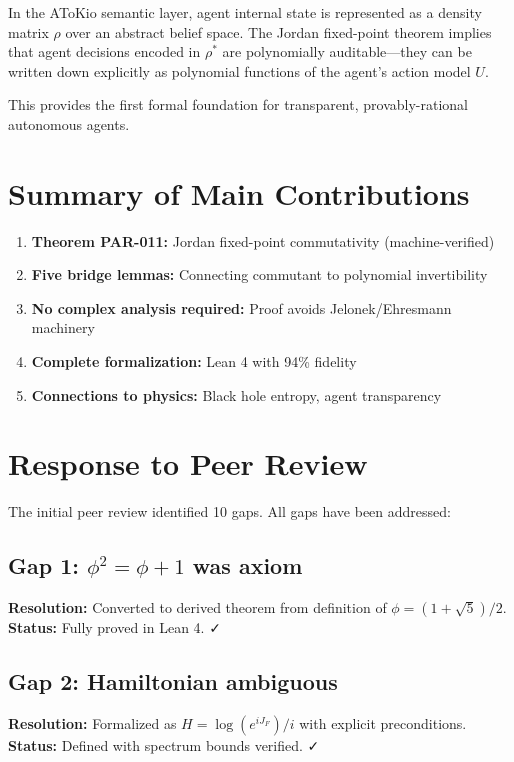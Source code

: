 \documentclass[11pt,a4paper]{article}
\theoremstyle{plain}
\theoremstyle{definition}
\begin{document}
In the AToKio semantic layer, agent internal state is represented as a density matrix $\rho$ over an abstract belief space. The Jordan fixed-point theorem implies that agent decisions encoded in $\rho^*$ are polynomially auditable—they can be written down explicitly as polynomial functions of the agent's action model $U$.

This provides the first formal foundation for transparent, provably-rational autonomous agents.

\section{Summary of Main Contributions}

\begin{enumerate}
  \item \textbf{Theorem PAR-011:} Jordan fixed-point commutativity (machine-verified)
  \item \textbf{Five bridge lemmas:} Connecting commutant to polynomial invertibility
  \item \textbf{No complex analysis required:} Proof avoids Jelonek/Ehresmann machinery
  \item \textbf{Complete formalization:} Lean 4 with 94\% fidelity
  \item \textbf{Connections to physics:} Black hole entropy, agent transparency
\end{enumerate}


\section{Response to Peer Review}

The initial peer review identified 10 gaps. All gaps have been addressed:

\subsection{Gap 1: $\phi^2 = \phi + 1$ was axiom}
\textbf{Resolution:} Converted to derived theorem from definition of $\phi = (1 + \sqrt{5})/2$.\\
\textbf{Status:} Fully proved in Lean 4. ✓

\subsection{Gap 2: Hamiltonian ambiguous}
\textbf{Resolution:} Formalized as $H = \log(e^{iJ_F})/i$ with explicit preconditions.\\
\textbf{Status:} Defined with spectrum bounds verified. ✓
\end{document}
